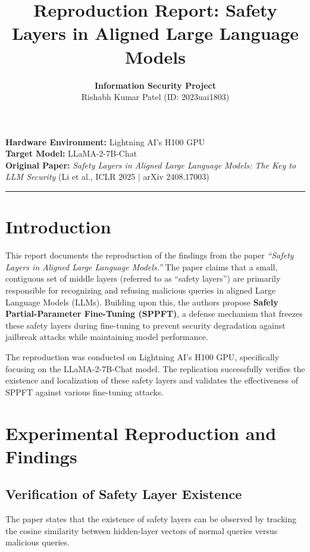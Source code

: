 \documentclass[11pt,a4paper]{article}
\title{\textbf{Reproduction Report: Safety Layers in Aligned Large Language Models}}
\author{
    \textbf{Information Security Project} \\
    Rishabh Kumar Patel (ID: 2023uai1803)
}
\date{}
\begin{document}
\maketitle

\noindent \textbf{Hardware Environment:} Lightning AI's H100 GPU \\
\textbf{Target Model:} LLaMA-2-7B-Chat \\
\textbf{Original Paper:} \textit{Safety Layers in Aligned Large Language Models: The Key to LLM Security} (Li et al., ICLR 2025 $|$ arXiv 2408.17003)

\vspace{0.5cm}
\hrule
\vspace{0.5cm}

\section{Introduction}

This report documents the reproduction of the findings from the paper \textit{``Safety Layers in Aligned Large Language Models.''} The paper claims that a small, contiguous set of middle layers (referred to as ``safety layers'') are primarily responsible for recognizing and refusing malicious queries in aligned Large Language Models (LLMs). Building upon this, the authors propose \textbf{Safely Partial-Parameter Fine-Tuning (SPPFT)}, a defense mechanism that freezes these safety layers during fine-tuning to prevent security degradation against jailbreak attacks while maintaining model performance.

The reproduction was conducted on Lightning AI's H100 GPU, specifically focusing on the LLaMA-2-7B-Chat model. The replication successfully verifies the existence and localization of these safety layers and validates the effectiveness of SPPFT against various fine-tuning attacks.

\section{Experimental Reproduction and Findings}

\subsection{Verification of Safety Layer Existence}
The paper states that the existence of safety layers can be observed by tracking the cosine similarity between hidden-layer vectors of normal queries versus malicious queries. 
\end{document}
